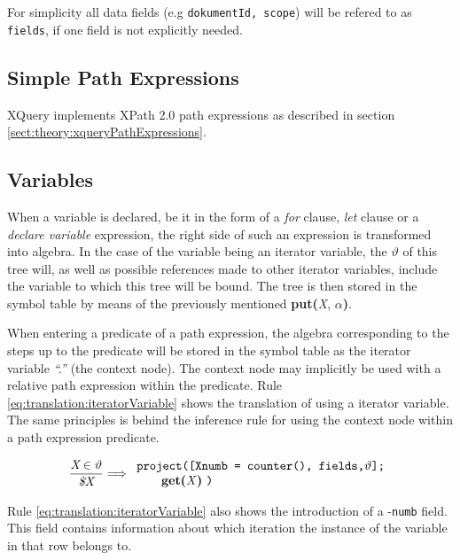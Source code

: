 For simplicity all data fields (e.g \verb!dokumentId, scope!) will be refered
to as \verb!fields!, if one field is not explicitly needed.

\subsection{Simple Path Expressions}
\label{sect:translation:smpPathExpr}
XQuery implements XPath 2.0 path expressions as described in section
\ref{sect:theory:xqueryPathExpressions}.


\subsection{Variables}
\label{sect:translation:variables}
When a variable is declared, be it in the form of a \textit{for} clause,
\textit{let} clause or a \textit{declare variable} expression, the right side
of such an expression is transformed into algebra. In the case of the
variable being an iterator variable, the $\vartheta$ of this tree will, as well
as possible references made to other iterator variables, include the variable
to which this tree will be bound. The tree is then stored in the symbol
table by means of the previously mentioned \textbf{put(}\textit{X},
$\alpha$\textbf{)}.

When entering a predicate of a path expression, the algebra corresponding to
the steps up to the predicate will be stored in the symbol table as the
iterator variable \textit{``.''} (the context node). The context node may
implicitly be used with a relative path expression within the predicate. Rule
\ref{eq:translation:iteratorVariable} shows the translation of using a
iterator variable. The same principles is behind the inference rule for using
the context node within a path expression predicate.

\begin{equation}
\centering
\frac{\displaystyle \textit{X} \in \vartheta}{\displaystyle \textit{\$X}}
\Longrightarrow
\begin{array}{l}
	\mbox{\texttt{project([Xnumb = counter(), fields,}} \vartheta
	\mbox{\texttt{];}}
	\\ \qquad
	\mbox{\textbf{get(}\textit{X}\textbf{)} \texttt{)}}
\end{array}
\label{eq:translation:iteratorVariable}
\end{equation}

Rule \ref{eq:translation:iteratorVariable} also shows the introduction of a
-\verb!numb! field. This field contains information about which iteration the
instance of the variable in that row belongs to.


